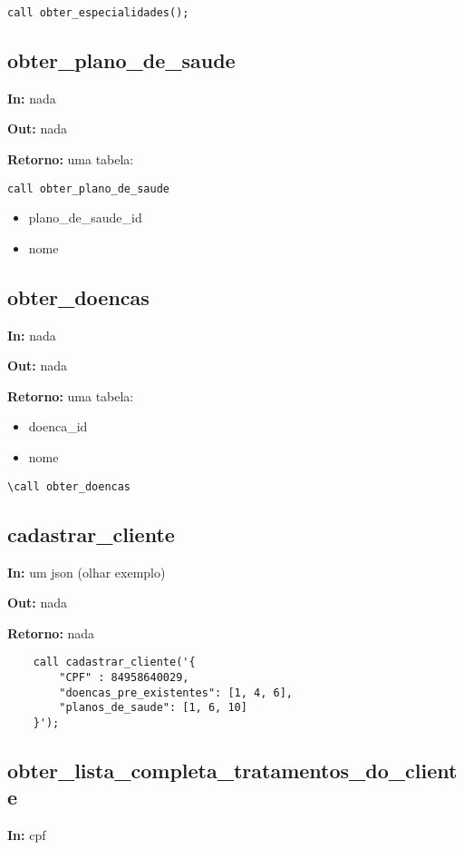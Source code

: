 \begin{verbatim}
call obter_especialidades();
\end{verbatim}

\subsection{obter\_plano\_de\_saude}

\textbf{In:} nada

\textbf{Out:} nada

\textbf{Retorno:} uma tabela:

\begin{verbatim}
call obter_plano_de_saude
\end{verbatim}

\begin{itemize}
	\item plano\_de\_saude\_id
	\item nome
\end{itemize}

\subsection{obter\_doencas}

\textbf{In:} nada

\textbf{Out:} nada

\textbf{Retorno:} uma tabela:

\begin{itemize}
	\item doenca\_id
	\item nome
\end{itemize}

\begin{verbatim}
\call obter_doencas
\end{verbatim}

\subsection{cadastrar\_cliente}
\textbf{In:} um json (olhar exemplo)

\textbf{Out:} nada

\textbf{Retorno:} nada

\begin{verbatim}
	call cadastrar_cliente('{
		"CPF" : 84958640029,
		"doencas_pre_existentes": [1, 4, 6],
		"planos_de_saude": [1, 6, 10]
	}');
\end{verbatim}

\subsection{obter\_lista\_completa\_tratamentos\_do\_cliente}
\textbf{In:} cpf

